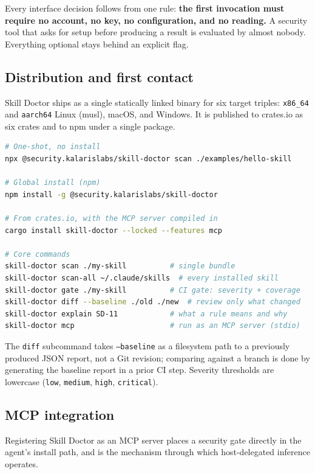 \documentclass[11pt]{article}
\begin{document}
Every interface decision follows from one rule: \textbf{the first invocation must require no account, no key, no configuration, and no reading.} A security tool that asks for setup before producing a result is evaluated by almost nobody. Everything optional stays behind an explicit flag.

\subsection{Distribution and first contact}

Skill Doctor ships as a single statically linked binary for six target triples: \texttt{x86\_64} and \texttt{aarch64} Linux (musl), macOS, and Windows. It is published to crates.io as six crates and to npm under a single package.

\begin{lstlisting}[language=bash,caption={Zero-configuration first contact.},label={lst:install}]
# One-shot, no install
npx @security.kalarislabs/skill-doctor scan ./examples/hello-skill

# Global install (npm)
npm install -g @security.kalarislabs/skill-doctor

# From crates.io, with the MCP server compiled in
cargo install skill-doctor --locked --features mcp

# Core commands
skill-doctor scan ./my-skill          # single bundle
skill-doctor scan-all ~/.claude/skills  # every installed skill
skill-doctor gate ./my-skill          # CI gate: severity + coverage
skill-doctor diff --baseline ./old ./new  # review only what changed
skill-doctor explain SD-11            # what a rule means and why
skill-doctor mcp                      # run as an MCP server (stdio)
\end{lstlisting}

The \texttt{diff} subcommand takes \texttt{--baseline} as a filesystem path to a previously produced JSON report, not a Git revision; comparing against a branch is done by generating the baseline report in a prior CI step. Severity thresholds are lowercase (\texttt{low}, \texttt{medium}, \texttt{high}, \texttt{critical}).

\subsection{MCP integration}

Registering Skill Doctor as an MCP server places a security gate directly in the agent's install path, and is the mechanism through which host-delegated inference operates.
\end{document}
